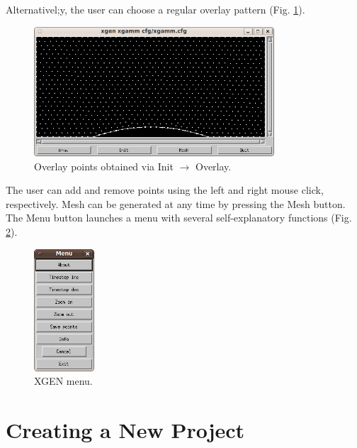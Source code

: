 \documentclass[12pt]{article}
\begin{document}
\newpage
\noindent
Alternativel;y, the user can choose a regular overlay pattern (Fig. \ref{fig:overlay}). 

  \begin{figure}[!ht]
  \begin{center}
  \includegraphics[width=0.8\textwidth]{xgen-1.png}
  \end{center}
  \vspace{-6mm}
  \caption{Overlay points obtained via Init $\rightarrow$ Overlay.}
  \label{fig:overlay}
  \end{figure}
\noindent 
  The user can add and remove points using the left and right mouse click,
  respectively. Mesh can be generated at any time by pressing the Mesh button.
  The Menu button launches a menu with several self-explanatory functions
  (Fig. \ref{fig:menu}). 

  \begin{figure}[!ht]
  \begin{center}
  \includegraphics[width=0.2\textwidth]{xgen-3.png}
  \end{center}
  \vspace{-6mm}
  \caption{XGEN menu.}
  \label{fig:menu}
  \end{figure}
\noindent 




  \section{Creating a New Project} \label{new-project}
\end{document}
